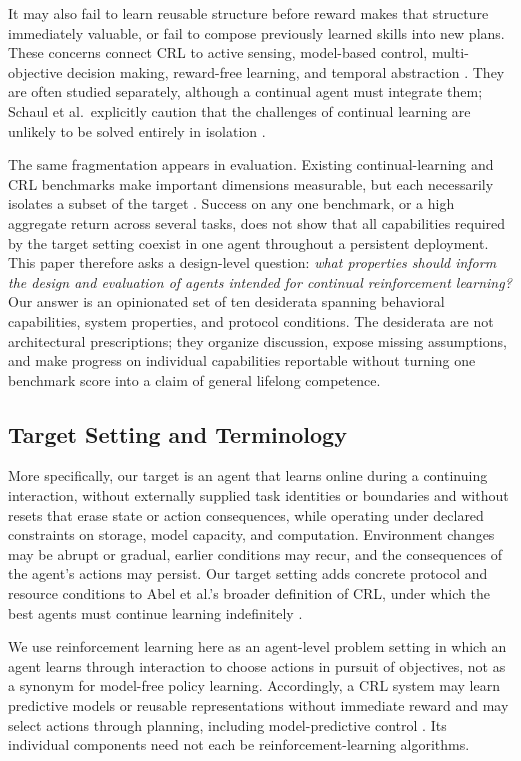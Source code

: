 \documentclass[10pt,journal,compsoc]{IEEEtran}
\begin{document}
It may also fail to learn reusable structure before reward makes that structure immediately valuable, or fail to compose previously learned skills into new plans.
These concerns connect CRL to active sensing, model-based control, multi-objective decision making, reward-free learning, and temporal abstraction \cite{bajcsy1988,hafner2025,hayes2022,jin2020,sutton1999}.
They are often studied separately, although a continual agent must integrate them; Schaul et al.\ explicitly caution that the challenges of continual learning are unlikely to be solved entirely in isolation \cite{schaul2018}.

The same fragmentation appears in evaluation.
Existing continual-learning and CRL benchmarks make important dimensions measurable, but each necessarily isolates a subset of the target \cite{wolczyk2021,powers2022,sharma2022,platanios2020}.
Success on any one benchmark, or a high aggregate return across several tasks, does not show that all capabilities required by the target setting coexist in one agent throughout a persistent deployment.
This paper therefore asks a design-level question: \emph{what properties should inform the design and evaluation of agents intended for continual reinforcement learning?}
Our answer is an opinionated set of ten desiderata spanning behavioral capabilities, system properties, and protocol conditions.
The desiderata are not architectural prescriptions; they organize discussion, expose missing assumptions, and make progress on individual capabilities reportable without turning one benchmark score into a claim of general lifelong competence.

\subsection{Target Setting and Terminology}

More specifically, our target is an agent that learns online during a continuing interaction, without externally supplied task identities or boundaries and without resets that erase state or action consequences, while operating under declared constraints on storage, model capacity, and computation.
Environment changes may be abrupt or gradual, earlier conditions may recur, and the consequences of the agent's actions may persist.
Our target setting adds concrete protocol and resource conditions to Abel et al.'s broader definition of CRL, under which the best agents must continue learning indefinitely \cite{abel2023}.

We use reinforcement learning here as an agent-level problem setting in which an agent learns through interaction to choose actions in pursuit of objectives, not as a synonym for model-free policy learning.
Accordingly, a CRL system may learn predictive models or reusable representations without immediate reward and may select actions through planning, including model-predictive control \cite{sutton1990,sutton2018}.
Its individual components need not each be reinforcement-learning algorithms.
\end{document}
